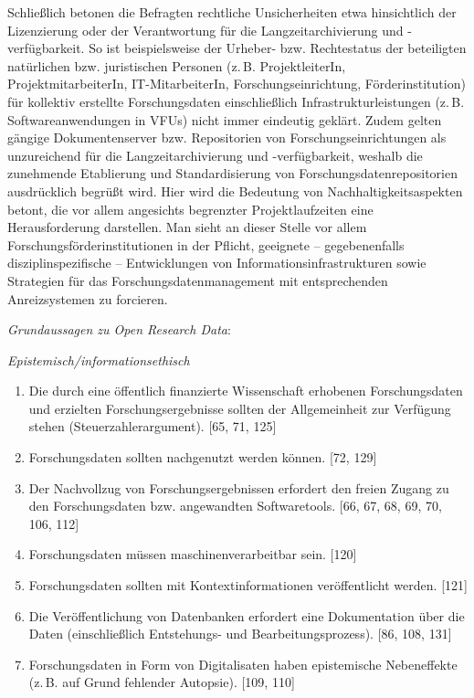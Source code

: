 \documentclass[a4paper,
fontsize=11pt,
oneside,
numbers=noperiodatend,
parskip=half-,
bibliography=totoc,
final
]{scrartcl}
\begin{document}
Schließlich betonen die Befragten rechtliche Unsicherheiten etwa
hinsichtlich der Lizenzierung oder der Verantwortung für die
Langzeitarchivierung und -verfügbarkeit. So ist beispielsweise der
Urheber- bzw. Rechtestatus der beteiligten natürlichen bzw. juristischen
Personen (z.\,B. ProjektleiterIn, ProjektmitarbeiterIn, IT-MitarbeiterIn,
Forschungseinrichtung, Förderinstitution) für kollektiv erstellte
Forschungsdaten einschließlich Infrastrukturleistungen (z.\,B.
Softwareanwendungen in VFUs) nicht immer eindeutig geklärt. Zudem gelten
gängige Dokumentenserver bzw. Repositorien von Forschungseinrichtungen
als unzureichend für die Langzeitarchivierung und -verfügbarkeit,
weshalb die zunehmende Etablierung und Standardisierung von
Forschungsdatenrepositorien ausdrücklich begrüßt wird. Hier wird die
Bedeutung von Nachhaltigkeitsaspekten betont, die vor allem angesichts
begrenzter Projektlaufzeiten eine Herausforderung darstellen. Man sieht
an dieser Stelle vor allem Forschungsförderinstitutionen in der Pflicht,
geeignete -- gegebenenfalls disziplinspezifische -- Entwicklungen von
Informationsinfrastrukturen sowie Strategien für das
Forschungsdatenmanagement mit entsprechenden Anreizsystemen zu
forcieren.

\emph{Grundaussagen zu Open Research Data}:

\emph{Epistemisch/informationsethisch}

\begin{enumerate}
\def\labelenumi{(\arabic{enumi})}
\item
  Die durch eine öffentlich finanzierte Wissenschaft erhobenen Forschungsdaten und erzielten Forschungsergebnisse
  sollten der Allgemeinheit zur Verfügung stehen
  (Steuerzahlerargument). {[}65, 71, 125{]}
\item
  Forschungsdaten sollten nachgenutzt werden können. {[}72, 129{]}
\item
  Der Nachvollzug von Forschungsergebnissen erfordert den freien Zugang zu den Forschungsdaten bzw. angewandten
  Softwaretools. {[}66, 67, 68, 69, 70, 106, 112{]}
\item
  Forschungsdaten müssen maschinenverarbeitbar sein. {[}120{]}
\item
  Forschungsdaten sollten mit Kontextinformationen veröffentlicht werden. {[}121{]}
\item
  Die Veröffentlichung von Datenbanken erfordert eine Dokumentation über die Daten (einschließlich Entstehungs- und Bearbeitungsprozess). {[}86, 108, 131{]}
\item
  Forschungsdaten in Form von Digitalisaten haben epistemische Nebeneffekte (z.\,B. auf Grund fehlender Autopsie).
  {[}109, 110{]}
\end{enumerate}
\end{document}
